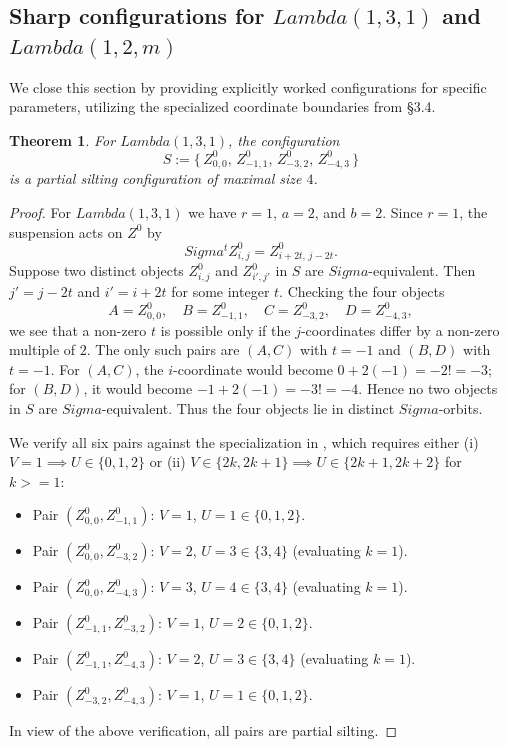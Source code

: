 \documentclass[11pt, a4paper]{article}
\newtheorem{theorem}{Theorem}[section]
\theoremstyle{definition}
\def\Lambda{Lambda}%
\def\Sigma{Sigma}%
\def\ge{>=}%
\def\neq{!=}%
\def\mathcal#1{#1}%
\begin{document}
\subsection{Sharp configurations for \texorpdfstring{$\Lambda(1,3,1)$}{Lambda(1,3,1)} and \texorpdfstring{$\Lambda(1,2,m)$}{Lambda(1,2,m)}}\label{sec:sharp-small}

We close this section by providing explicitly worked configurations for specific parameters, utilizing the specialized coordinate boundaries from \S 3.4.

\begin{theorem}\label{thm:131}
For $\Lambda(1,3,1)$, the configuration
\[
  S := \bigl\{\, Z_{0,0}^0,\, Z_{-1,1}^0,\, Z_{-3,2}^0,\, Z_{-4,3}^0 \,\bigr\}
\]
is a partial silting configuration of maximal size $4$.
\end{theorem}

\begin{proof}
For $\Lambda(1,3,1)$ we have $r=1$, $a=2$, and $b=2$. Since $r=1$, the suspension acts on $\mathcal Z^0$ by
\[
  \Sigma^t Z_{i,j}^0 = Z_{i+2t,\, j-2t}^0.
\]
Suppose two distinct objects $Z_{i,j}^0$ and $Z_{i',j'}^0$ in $S$ are $\Sigma$-equivalent. Then $j' = j - 2t$ and $i' = i + 2t$ for some integer $t$. Checking the four objects
\[
  A = Z_{0,0}^0,\quad
  B = Z_{-1,1}^0,\quad
  C = Z_{-3,2}^0,\quad
  D = Z_{-4,3}^0,
\]
we see that a non-zero $t$ is possible only if the $j$-coordinates differ by a non-zero multiple of $2$. The only such pairs are $(A,C)$ with $t=-1$ and $(B,D)$ with $t=-1$. For $(A,C)$, the $i$-coordinate would become $0 + 2(-1) = -2 \neq -3$; for $(B,D)$, it would become $-1 + 2(-1) = -3 \neq -4$. Hence no two objects in $S$ are $\Sigma$-equivalent. Thus the four objects lie in distinct $\Sigma$-orbits.

We verify all six pairs against the specialization in , which requires either (i) $V=1 \implies U \in \{0,1,2\}$ or (ii) $V \in \{2k, 2k+1\} \implies U \in \{2k+1, 2k+2\}$ for $k \ge 1$:
\begin{itemize}
  \item Pair $(Z_{0,0}^0, Z_{-1,1}^0)$: $V=1$, $U=1 \in \{0,1,2\}$.
  \item Pair $(Z_{0,0}^0, Z_{-3,2}^0)$: $V=2$, $U=3 \in \{3,4\}$ (evaluating $k=1$).
  \item Pair $(Z_{0,0}^0, Z_{-4,3}^0)$: $V=3$, $U=4 \in \{3,4\}$ (evaluating $k=1$).
  \item Pair $(Z_{-1,1}^0, Z_{-3,2}^0)$: $V=1$, $U=2 \in \{0,1,2\}$.
  \item Pair $(Z_{-1,1}^0, Z_{-4,3}^0)$: $V=2$, $U=3 \in \{3,4\}$ (evaluating $k=1$).
  \item Pair $(Z_{-3,2}^0, Z_{-4,3}^0)$: $V=1$, $U=1 \in \{0,1,2\}$.
\end{itemize}
In view of the above verification, all pairs are partial silting.
\end{proof}
\end{document}
